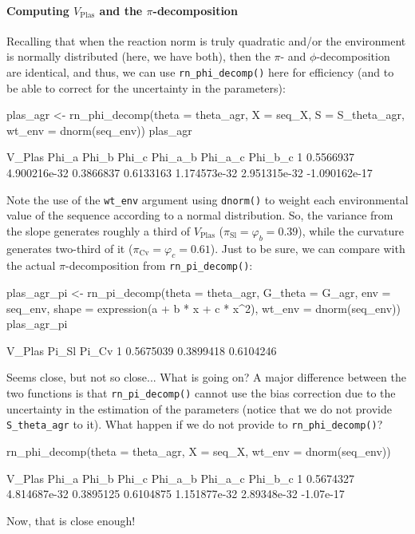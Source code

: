 \documentclass[a4paper,12pt,twoside]{article}
\begin{document}
\paragraph{Computing $V_{\text{Plas}}$ and the $\pi$-decomposition}
Recalling that when the reaction norm is truly quadratic and/or the environment is normally distributed (here, we have both), then the $\pi$- and $\phi$-decomposition are identical, and thus, we can use \texttt{rn\_phi\_decomp()} here for efficiency (and to be able to correct for the uncertainty in the parameters):
\begin{Rinput}
plas_agr <-
    rn_phi_decomp(theta  = theta_agr,
                  X      = seq_X,
                  S      = S_theta_agr,
                  wt_env = dnorm(seq_env))
plas_agr
\end{Rinput}
\begin{Routput}
     V_Plas        Phi_a     Phi_b     Phi_c      Phi_a_b      Phi_a_c       Phi_b_c
1 0.5566937 4.900216e-32 0.3866837 0.6133163 1.174573e-32 2.951315e-32 -1.090162e-17
\end{Routput}
Note the use of the \texttt{wt\_env} argument using \texttt{dnorm()} to weight each environmental value of the sequence according to a normal distribution.
So, the variance from the slope generates roughly a third of $V_{\text{Plas}}$ ($\pi_{\text{Sl}}=\varphi_{b} = 0.39$), while the curvature generates two-third of it ($\pi_{\text{Cv}}=\varphi_{c} = 0.61$).
Just to be sure, we can compare with the actual $\pi$-decomposition from \texttt{rn\_pi\_decomp()}:
\begin{Rinput}
plas_agr_pi <-
    rn_pi_decomp(theta   = theta_agr,
                    G_theta = G_agr,
                    env     = seq_env,
                    shape   = expression(a + b * x + c * x^2),
                    wt_env  = dnorm(seq_env))
plas_agr_pi
\end{Rinput}
\begin{Routput}
     V_Plas     Pi_Sl     Pi_Cv
1 0.5675039 0.3899418 0.6104246
\end{Routput}
Seems close, but not so close... What is going on? A major difference between the two functions is that \texttt{rn\_pi\_decomp()} cannot use the bias correction due to the uncertainty in the estimation of the parameters (notice that we do not provide \texttt{S\_theta\_agr} to it). What happen if we do not provide to \texttt{rn\_phi\_decomp()}?
\begin{Rinput}
rn_phi_decomp(theta  = theta_agr,
              X      = seq_X,
              wt_env = dnorm(seq_env))
\end{Rinput}
\begin{Routput}
     V_Plas        Phi_a     Phi_b     Phi_c      Phi_a_b     Phi_a_c   Phi_b_c
1 0.5674327 4.814687e-32 0.3895125 0.6104875 1.151877e-32 2.89348e-32 -1.07e-17
\end{Routput}
Now, that is close enough!
\end{document}
